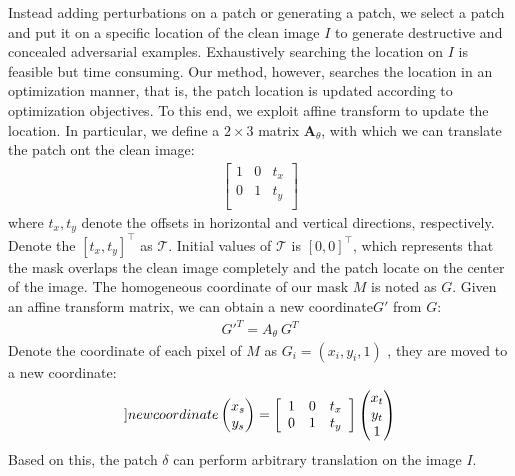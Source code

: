 \documentclass[10pt,twocolumn,letterpaper]{article}
\begin{document}
Instead adding perturbations on a patch
or generating a patch, we select a patch and put it on a specific
location of the clean 
image $I$ to generate destructive and concealed adversarial examples. 
Exhaustively searching the location on $I$ is feasible but time 
consuming. 
Our method, however, searches the location in an optimization manner, 
that is, the patch location is updated according to 
optimization objectives.
To this end, we exploit affine transform to update the location.
In particular, we define a $2 \times 3$ matrix 
$\mathbf{A}_\theta$, with which we can translate the patch ont 
the clean image: 
\begin{align}
	\left[
		\begin{array}{ccc}
			1 & 0 & t_x \\
			0 & 1 & t_y \\
		\end{array}
		\right]      
\end{align}
where $t_x, t_y$ denote the offsets in 
horizontal and vertical directions, respectively. 
Denote the $[t_x,t_y]^\top$ as $\mathcal{T}$.
Initial values of $\mathcal{T}$ is $[0,0]^\top$, 
which represents that the mask overlaps the 
clean image completely and the patch
locate on the center of the image.
The homogeneous coordinate of our mask $M$ is noted as $G$.
Given an affine transform matrix, we can obtain a new 
coordinate$G'$ from $G$:
\begin{align}
	{G'}^T = A_{\theta}~{G}^T
\end{align}
Denote the coordinate of each pixel of $M$ 
as $G_i = (x_i, y_i, 1)$ ,
they are moved to a new coordinate:
\begin{align}
	\label[]{new coordinate}
\begin{pmatrix}
	x_s\\
	y_s	
	\end{pmatrix} = 
		\left[
			\begin{array}{ccc}
				1 & 0 & t_x \\
				0 & 1 & t_y \\
			\end{array}
			\right] 
			\begin{pmatrix}
				x_t\\
				y_t\\
				1	
				\end{pmatrix} 
\end{align}
Based on this, the patch $\delta$ can perform 
arbitrary translation on the image $I$.

\end{document}
